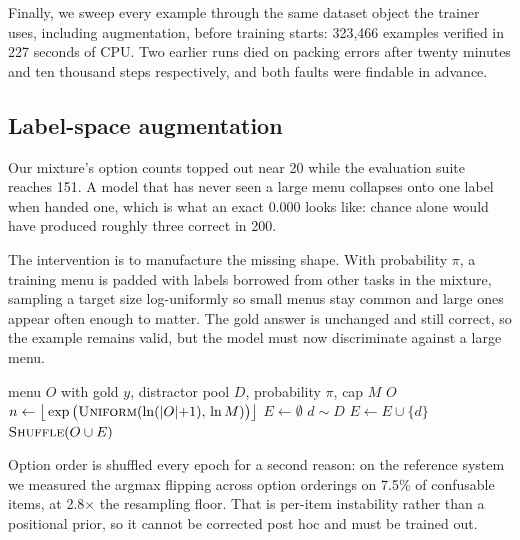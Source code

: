 Finally, we sweep every example through the same dataset object the
trainer uses, including augmentation, before training starts: 323{,}466
examples verified in 227 seconds of CPU. Two earlier runs died on packing
errors after twenty minutes and ten thousand steps respectively, and both
faults were findable in advance.

\subsection{Label-space augmentation}
\label{sec:data-aug}

Our mixture's option counts topped out near 20 while the evaluation suite
reaches 151. A model that has never seen a large menu collapses onto one
label when handed one, which is what an exact $0.000$ looks like: chance
alone would have produced roughly three correct in 200.

The intervention is to manufacture the missing shape. With probability
$\pi$, a training menu is padded with labels borrowed from other tasks in
the mixture, sampling a target size log-uniformly so small menus stay
common and large ones appear often enough to matter. The gold answer is
unchanged and still correct, so the example remains valid, but the model
must now discriminate against a large menu.

\begin{algorithm}[t]
\caption{Label-space augmentation for one \choice{} question}
\label{alg:aug}
\begin{algorithmic}[1]
\Require menu $O$ with gold $y$, distractor pool $D$, probability $\pi$,
  cap $M$
 \Return $O$ \EndIf
\State $n \gets \big\lfloor \exp\big(\textproc{Uniform}(\ln(|O|{+}1),\,
  \ln M)\big) \big\rfloor$ 
\State $E \gets \emptyset$
  \State $d \sim D$
   
    \State $E \gets E \cup \{d\}$
  \EndIf
\EndWhile
\State \Return $\textproc{Shuffle}(O \cup E)$ 
\end{algorithmic}
\end{algorithm}

Option order is shuffled every epoch for a second reason: on the reference
system we measured the argmax flipping across option orderings on 7.5\% of
confusable items, at 2.8$\times$ the resampling floor. That is per-item
instability rather than a positional prior, so it cannot be corrected post
hoc and must be trained out.

